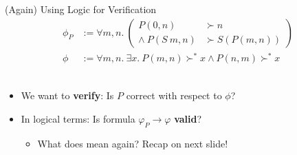 \begin{frame}{(Again) Using Logic for Verification}
	\begin{align*}
		\phi_P &:= ∀ m, n.~ \left(\begin{aligned}
			  P(0, n)   &\succ n\\
			∧~ P(S~m, n) &\succ S(P(m, n))
		\end{aligned}\right)\\[1em]
		\phi &:= ∀ m, n.~∃ x.~ P(m, n) \succ^{*} x ∧ P(n, m) \succ^* x
	\end{align*}
~\\[1.5em]
\begin{itemize}

	\item We want to \textbf{verify}: Is $P$ correct with respect to $\phi$?
	\item In logical terms: Is formula $φ_P → φ$ \textbf{valid}?
	\begin{itemize}
		\item What does  mean again? Recap on next slide!
	\end{itemize}

\end{itemize}
\end{frame}

